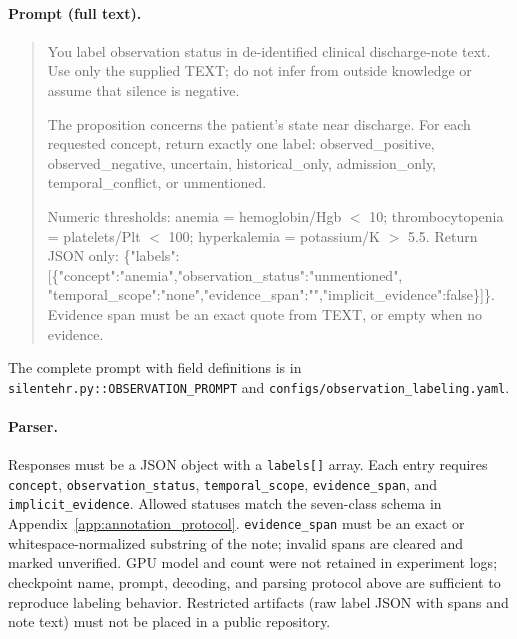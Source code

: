 \documentclass[11pt]{article}
\begin{document}
\paragraph{Prompt (full text).}
\begin{quote}\small\ttfamily
You label observation status in de-identified clinical discharge-note text.
Use only the supplied TEXT; do not infer from outside knowledge or assume
that silence is negative.

The proposition concerns the patient's state near discharge. For each requested
concept, return exactly one label:
observed\_positive, observed\_negative, uncertain, historical\_only,
admission\_only, temporal\_conflict, or unmentioned.

Numeric thresholds: anemia = hemoglobin/Hgb $<$ 10; thrombocytopenia =
platelets/Plt $<$ 100; hyperkalemia = potassium/K $>$ 5.5. Return JSON only:
\{"labels":[\{"concept":"anemia","observation\_status":"unmentioned",
"temporal\_scope":"none","evidence\_span":"","implicit\_evidence":false\}]\}.
Evidence span must be an exact quote from TEXT, or empty when no evidence.
\end{quote}
The complete prompt with field definitions is in
\texttt{silentehr.py::OBSERVATION\_PROMPT} and
\texttt{configs/observation\_labeling.yaml}.

\paragraph{Parser.}
Responses must be a JSON object with a \texttt{labels[]} array. Each entry
requires \texttt{concept}, \texttt{observation\_status}, \texttt{temporal\_scope},
\texttt{evidence\_span}, and \texttt{implicit\_evidence}. Allowed statuses match
the seven-class schema in Appendix~\ref{app:annotation_protocol}.
\texttt{evidence\_span} must be an exact or whitespace-normalized substring of
the note; invalid spans are cleared and marked unverified. GPU model and count
were not retained in experiment logs; checkpoint name, prompt, decoding, and
parsing protocol above are sufficient to reproduce labeling behavior.
Restricted artifacts (raw label JSON with spans and note text) must not be
placed in a public repository.
\end{document}
